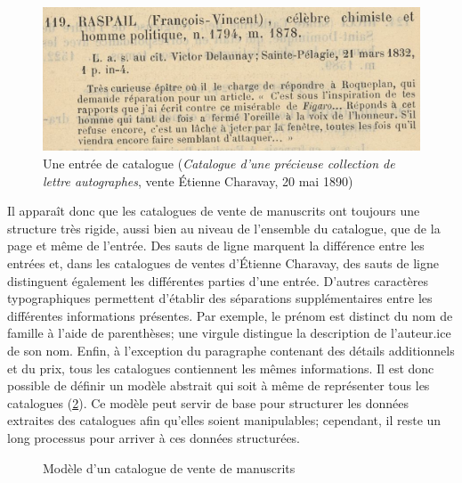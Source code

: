 \begin{figure}[h]
	\centering
	\includegraphics[width=\textwidth]{img/CAT_000441_e119}
	\caption{Une entrée de catalogue (\textit{Catalogue d'une précieuse collection de lettre autographes}, vente Étienne Charavay, 20 mai 1890)}
	\label{fig:catitem}
\end{figure}

Il apparaît donc que les catalogues de vente de manuscrits ont toujours une structure très rigide, aussi bien au niveau de l'ensemble du catalogue, que de la page et même de l'entrée. Des sauts de ligne marquent la différence entre les entrées et, dans les catalogues de ventes d'Étienne Charavay, des sauts de ligne distinguent également les différentes parties d'une entrée. D'autres caractères typographiques permettent d'établir des séparations supplémentaires entre les différentes informations présentes. Par exemple, le prénom est distinct du nom de famille à l'aide de parenthèses; une virgule distingue la description de l'auteur.ice de son nom. Enfin, à l'exception du paragraphe contenant des détails additionnels et du prix, tous les catalogues contiennent les mêmes informations. Il est donc possible de définir un modèle abstrait qui soit à même de représenter tous les catalogues (\ref{fig:catmodel}). Ce modèle peut servir de base pour structurer les données extraites des catalogues afin qu'elles soient manipulables; cependant, il reste un long processus pour arriver à ces données structurées.

\begin{figure}[h]
	\centering
	\caption{Modèle d'un catalogue de vente de manuscrits}
	\label{fig:catmodel}
\end{figure}


